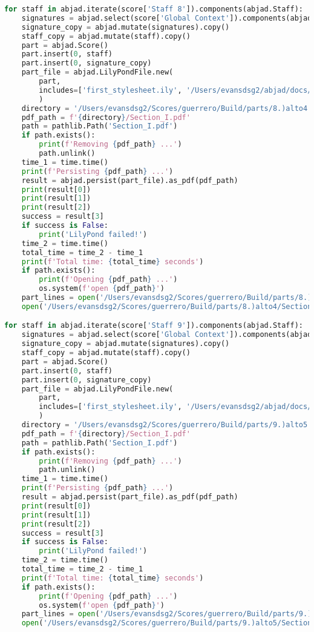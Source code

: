 \begin{lstlisting}[language=Python, caption=Invocation Source Code]
for staff in abjad.iterate(score['Staff 8']).components(abjad.Staff):
    signatures = abjad.select(score['Global Context']).components(abjad.Staff)
    signature_copy = abjad.mutate(signatures).copy()
    staff_copy = abjad.mutate(staff).copy()
    part = abjad.Score()
    part.insert(0, staff)
    part.insert(0, signature_copy)
    part_file = abjad.LilyPondFile.new(
        part,
        includes=['first_stylesheet.ily', '/Users/evansdsg2/abjad/docs/source/_stylesheets/abjad.ily'],
        )
    directory = '/Users/evansdsg2/Scores/guerrero/Build/parts/8.)alto4'
    pdf_path = f'{directory}/Section_I.pdf'
    path = pathlib.Path('Section_I.pdf')
    if path.exists():
        print(f'Removing {pdf_path} ...')
        path.unlink()
    time_1 = time.time()
    print(f'Persisting {pdf_path} ...')
    result = abjad.persist(part_file).as_pdf(pdf_path)
    print(result[0])
    print(result[1])
    print(result[2])
    success = result[3]
    if success is False:
        print('LilyPond failed!')
    time_2 = time.time()
    total_time = time_2 - time_1
    print(f'Total time: {total_time} seconds')
    if path.exists():
        print(f'Opening {pdf_path} ...')
        os.system(f'open {pdf_path}')
    part_lines = open('/Users/evansdsg2/Scores/guerrero/Build/parts/8.)alto4/Section_I.ly').readlines()
    open('/Users/evansdsg2/Scores/guerrero/Build/parts/8.)alto4/Section_I.ly', 'w').writelines(part_lines[15:-1])

for staff in abjad.iterate(score['Staff 9']).components(abjad.Staff):
    signatures = abjad.select(score['Global Context']).components(abjad.Staff)
    signature_copy = abjad.mutate(signatures).copy()
    staff_copy = abjad.mutate(staff).copy()
    part = abjad.Score()
    part.insert(0, staff)
    part.insert(0, signature_copy)
    part_file = abjad.LilyPondFile.new(
        part,
        includes=['first_stylesheet.ily', '/Users/evansdsg2/abjad/docs/source/_stylesheets/abjad.ily'],
        )
    directory = '/Users/evansdsg2/Scores/guerrero/Build/parts/9.)alto5'
    pdf_path = f'{directory}/Section_I.pdf'
    path = pathlib.Path('Section_I.pdf')
    if path.exists():
        print(f'Removing {pdf_path} ...')
        path.unlink()
    time_1 = time.time()
    print(f'Persisting {pdf_path} ...')
    result = abjad.persist(part_file).as_pdf(pdf_path)
    print(result[0])
    print(result[1])
    print(result[2])
    success = result[3]
    if success is False:
        print('LilyPond failed!')
    time_2 = time.time()
    total_time = time_2 - time_1
    print(f'Total time: {total_time} seconds')
    if path.exists():
        print(f'Opening {pdf_path} ...')
        os.system(f'open {pdf_path}')
    part_lines = open('/Users/evansdsg2/Scores/guerrero/Build/parts/9.)alto5/Section_I.ly').readlines()
    open('/Users/evansdsg2/Scores/guerrero/Build/parts/9.)alto5/Section_I.ly', 'w').writelines(part_lines[15:-1])


\end{lstlisting}
